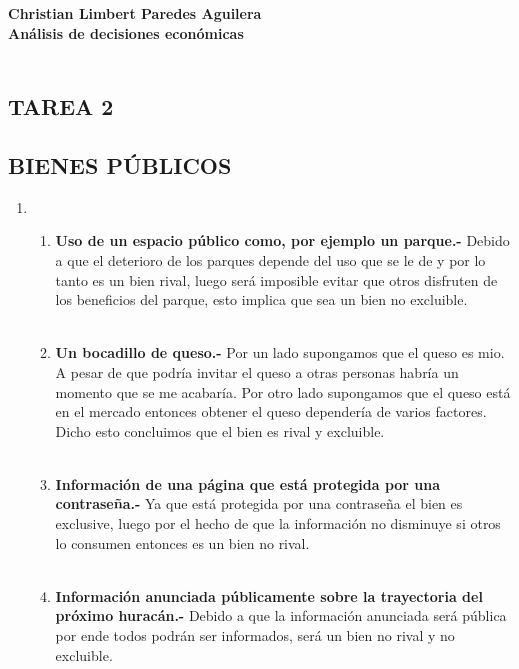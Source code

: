 \textbf{\bfseries Christian Limbert Paredes Aguilera}\\
\textbf{Análisis de decisiones económicas}\\\\
\subsection*{\center TAREA 2}
\vspace{.4cm}
\subsection*{\center BIENES PÚBLICOS}
\vspace{1cm}

\begin{enumerate}

    \item 

    \begin{enumerate}[\bfseries a.]

	\item \textbf{Uso de un espacio público como, por ejemplo un parque.-} Debido a que el deterioro de los parques depende del uso que se le de y por lo tanto es un bien rival, luego será imposible evitar que otros disfruten de los beneficios del parque, esto implica que sea un bien no excluible.\\\\

	\item \textbf{Un bocadillo de queso.-} Por un lado supongamos que el queso es mio. A pesar de que podría invitar el queso a otras personas habría un momento que se me acabaría. Por otro lado supongamos que el queso está en el mercado entonces obtener el queso dependería de varios factores. Dicho esto concluimos que el bien es rival y excluible.\\\\

	\item \textbf{Información de una página que está protegida por una contraseña.-} Ya que está protegida por una contraseña el bien es exclusive, luego por el hecho de que la información no disminuye si otros lo consumen entonces es un bien no rival.\\\\

	\item \textbf{Información anunciada públicamente sobre la trayectoria del próximo huracán.-} Debido a que la información anunciada será pública por ende todos podrán ser informados, será un bien no rival y no excluible.\\\\


\end{enumerate}
\end{enumerate}
